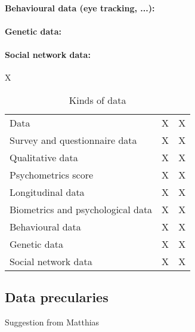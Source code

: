 \documentclass{article}
\begin{document}
\paragraph{Behavioural data (eye tracking, ...):}

\paragraph{Genetic data:}

\paragraph{Social network data:}
X

\begin{table}[H]
    \centering
    \begin{tabular}{lcc}
        Data & X & X \\
        Survey and questionnaire data & X & X \\
        Qualitative data & X & X \\
        Psychometrics score & X & X \\
        Longitudinal data & X & X \\
        Biometrics and psychological data & X & X \\
        Behavioural data & X & X \\
        Genetic data & X & X \\
        Social network data & X & X \\
    \end{tabular}
    \caption{Kinds of data}
    \label{tab:tab2}
\end{table}

\subsection{Data precularies}

\color{blue} 
Suggestion from Matthias
\color{black}
\end{document}
